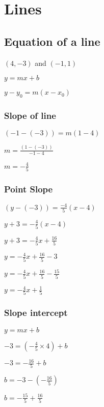 \documentclass[12pt,a4paper]{article}
\begin{document}
\section*{Lines}

\subsection*{Equation of a line}

$(4, -3)$ and $(-1, 1)$
\newline

\noindent $y = mx + b$

\noindent $ y - y_{0} = m(x - x_{0})$
\newline

\subsubsection*{Slope of line}

\noindent $(-1 - (-3)) = m(1 - 4)$

\noindent $m = \frac{(1 - (-3))}{-1 - 4}$

\noindent $\boxed{m = -\frac{4}{5}}$
\newline


\subsubsection*{Point Slope}

\noindent $(y - (-3)) = \frac{-4}{5}(x - 4)$

\noindent $y + 3 = -\frac{4}{5}(x - 4)$

\noindent $y + 3 = -\frac{4}{5}x + \frac{16}{5}$

\noindent $y= -\frac{4}{5}x + \frac{16}{5} - 3$

\noindent $y= -\frac{4}{5}x + \frac{16}{5} - \frac{15}{5}$

\noindent $\boxed{y= -\frac{4}{5}x + \frac{1}{5}}$

\subsubsection*{Slope intercept}

\noindent $y = mx + b$

\noindent $-3 = (-\frac{4}{5} \times 4) + b$

\noindent $-3 = -\frac{16}{5} + b$

\noindent $b = -3 - (-\frac{16}{5})$

\noindent $b = -\frac{15}{5} + \frac{16}{5}$
\end{document}
